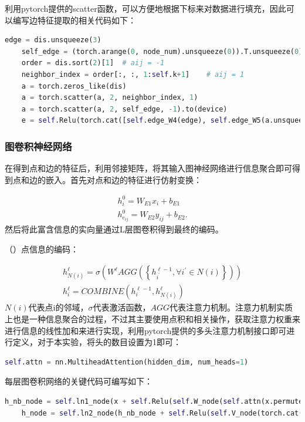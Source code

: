 \documentclass[withoutpreface,bwprint]{cumcmthesis} %
\newcounter{Emp}[subsubsection]	%
\newcommand{\kuohao}{\addtocounter{Emp}{1} \noindent （\theEmp）}
\begin{document}
	利用pytorch提供的scatter函数，可以方便地根据下标来对数据进行填充，因此可以编写边特征提取的相关代码如下：
	\begin{lstlisting}[language=python]
	edge = dis.unsqueeze(3)
	self_edge = (torch.arange(0, node_num).unsqueeze(0)).T.unsqueeze(0).repeat(batch_size, 1, 1).to(device)
	order = dis.sort(2)[1]	# aij = -1
	neighbor_index = order[:, :, 1:self.k+1]	# aij = 1
	a = torch.zeros_like(dis)
	a = torch.scatter(a, 2, neighbor_index, 1)
	a = torch.scatter(a, 2, self_edge, -1).to(device)
	e = self.Relu(torch.cat([self.edge_W4(edge), self.edge_W5(a.unsqueeze(3))], dim=3))
	\end{lstlisting}

\subsubsection{图卷积神经网络}
在得到点和边的特征后，利用邻接矩阵，将其输入图神经网络进行信息聚合即可得到点和边的嵌入。首先对点和边的特征进行仿射变换：

$$
\begin{array}{r}
h_{i}^{0}=W_{E 1} x_{i}+b_{E 1} \\
h_{e_{i j}}^{0}=W_{E 2} y_{i j}+b_{E 2} .
\end{array}
$$
然后将此富含信息的实向量通过L层图卷积得到最终的编码。

\kuohao 点信息的编码：


$$
\begin{array}{c}
h_{N(i)}^{\ell}=\sigma\left(W^{\ell} A G G\left(\left\{h_{i^{\prime}}^{\ell-1}, \forall i^{\prime} \in N(i)\right\}\right)\right) \\
h_{i}^{\ell}=C O M B I N E\left(h_{i}^{\ell-1}, h_{N(i)}^{\ell}\right)
\end{array}
$$
$N(i)$代表点i的邻域，$\sigma$代表激活函数，$AGG$代表注意力机制。注意力机制实质上也是一种信息聚合的过程，不过其主要使用点积和相关操作，获取注意力权重来进行信息的线性加和来进行实现，利用pytorch提供的多头注意力机制接口即可进行定义，对于本实验，将头的数目设置为1即可：
\begin{lstlisting}[language=python]
	self.attn = nn.MultiheadAttention(hidden_dim, num_heads=1)
\end{lstlisting}
每层图卷积网络的关键代码可编写如下：
\begin{lstlisting}[language=python]
	h_nb_node = self.ln1_node(x + self.Relu(self.W_node(self.attn(x.permute(1, 0, 2), neighbor.permute(1, 0, 2, 3), neighbor.permute(1, 0, 2, 3))[0].permute(1, 0, 2))))
	h_node = self.ln2_node(h_nb_node + self.Relu(self.V_node(torch.cat([self.V_node_in(x), h_nb_node], dim=-1))))
\end{lstlisting}
\end{document}
